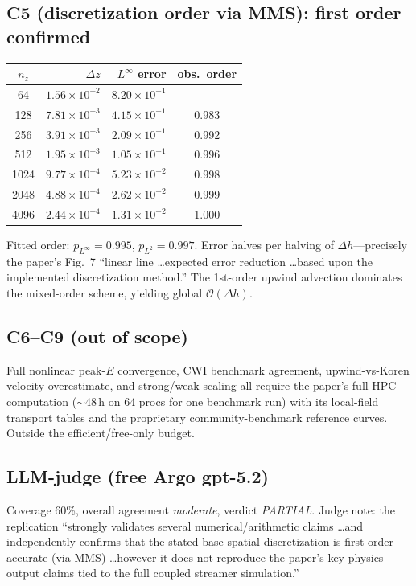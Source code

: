 \documentclass[11pt]{article}
\begin{document}
\subsection*{C5 (discretization order via MMS): first order confirmed}
\begin{center}\small
\begin{tabular}{crrc}
\toprule
$n_z$ & $\Delta z$ & $L^{\infty}$ error & obs.\ order \\
\midrule
64   & $1.56\times 10^{-2}$ & $8.20\times 10^{-1}$ & --- \\
128  & $7.81\times 10^{-3}$ & $4.15\times 10^{-1}$ & 0.983 \\
256  & $3.91\times 10^{-3}$ & $2.09\times 10^{-1}$ & 0.992 \\
512  & $1.95\times 10^{-3}$ & $1.05\times 10^{-1}$ & 0.996 \\
1024 & $9.77\times 10^{-4}$ & $5.23\times 10^{-2}$ & 0.998 \\
2048 & $4.88\times 10^{-4}$ & $2.62\times 10^{-2}$ & 0.999 \\
4096 & $2.44\times 10^{-4}$ & $1.31\times 10^{-2}$ & 1.000 \\
\bottomrule
\end{tabular}
\end{center}
Fitted order: $p_{L^{\infty}} = 0.995$, $p_{L^{2}} = 0.997$. Error halves per
halving of $\Delta h$---precisely the paper's Fig.~7 ``linear line \dots expected
error reduction \dots based upon the implemented discretization method.'' The
1st-order upwind advection dominates the mixed-order scheme, yielding global
$\mathcal{O}(\Delta h)$.

\subsection*{C6--C9 (out of scope)}
Full nonlinear peak-$E$ convergence, CWI benchmark agreement, upwind-vs-Koren
velocity overestimate, and strong/weak scaling all require the paper's full HPC
computation ($\sim$48\,h on 64 procs for one benchmark run) with its local-field
transport tables and the proprietary community-benchmark reference curves.
Outside the efficient/free-only budget.

\subsection*{LLM-judge (free Argo gpt-5.2)}
Coverage 60\%, overall agreement \emph{moderate}, verdict \emph{PARTIAL}.
Judge note: the replication ``strongly validates several numerical/arithmetic
claims \dots and independently confirms that the stated base spatial
discretization is first-order accurate (via MMS) \dots however it does not
reproduce the paper's key physics-output claims tied to the full coupled
streamer simulation.''
\end{document}

